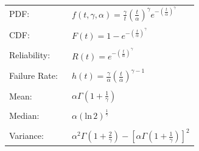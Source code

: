 \documentclass[12pt]{article}
\begin{document}
\pagestyle{empty}
\Large
{}
\pagecolor{ehandbook}

\bf
\boldmath


\begin{tabular}{ll}
PDF:                 & $\displaystyle{ f(t, \gamma, \alpha) = \frac{\gamma}{t} \left( \frac{t}{\alpha} \right) ^\gamma e^{- \left( \frac{t}{\alpha} \right)^\gamma}}$ \\
                       & \\
CDF:                 & $\displaystyle{F(t) = 1-e^{- \left( \frac{t}{\alpha} \right)^\gamma}}$ \\
                     & \\
Reliability:         & $\displaystyle{R(t) =e^{- \left( \frac{t}{\alpha} \right)^\gamma}}$ \\
                     & \\
Failure Rate: \,\,   & $\displaystyle{h(t) =  \frac{\gamma}{\alpha} \left( \frac{t}{\alpha} \right) ^{\gamma-1}}$ \\
                     & \\
Mean:                & $\displaystyle{\alpha \Gamma \left(1+\frac{1}{\gamma} \right)}$ \\
                     & \\
Median:             & $\displaystyle{\alpha (\mbox{ln} \, 2)^{\frac{1}{\gamma}}}$ \\
                       & \\
Variance:            & $\displaystyle{\alpha^2 \Gamma \left( 1+\frac{2}{\gamma} \right) - \left[ \alpha \Gamma \left( 1 + \frac{1}{\gamma}\right) \right]^2}$ 
\end{tabular}
  
 
\end{document}
